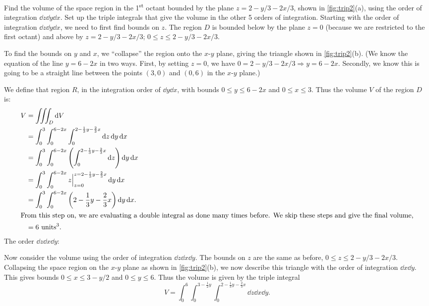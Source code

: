 \begin{example}\label{ex_trip2}%
Find the volume of the space region in the 1\textsuperscript{st} octant bounded by the plane $z=2-y/3-2x/3$, shown in \autoref{fig:trip2}(a), using the order of integration $\dd z\dd y\dd x$. Set up the triple integrals that give the volume in the other 5 orders of integration.
\solution
Starting with the order of integration $\dd z\dd y\dd x$, we need to first find bounds on $z$. The region $D$ is bounded below by the plane $z=0$ (because we are restricted to the first octant) and above by $z=2-y/3-2x/3$; $0\leq z\leq 2-y/3-2x/3$.

To find the bounds on $y$ and $x$, we ``collapse'' the region onto the $x$-$y$ plane, giving the triangle shown in \autoref{fig:trip2}(b). (We know the equation of the line $y=6-2x$ in two ways. First, by setting $z=0$, we have $0 = 2-y/3-2x/3 \Rightarrow y=6-2x$. Secondly, we know this is going to be a straight line between the points $(3,0)$ and $(0,6)$ in the $x$-$y$ plane.)

We define that region $R$, in the integration order of $\dd y\dd x$, with bounds $0\leq y\leq 6-2x$ and $0\leq x\leq 3$. Thus the volume $V$ of the region $D$ is:
\begin{align*}
	V &= \iiint_D \dd V\\
	&= \int_0^3\int_0^{6-2x}\int_0^{2-\frac 13y-\frac 23x}\dd z\dd y\dd x \\
	&= \int_0^3\int_0^{6-2x}\left(\int_0^{2-\frac 13y-\frac 23x}\dd z\right)\dd y\dd x \\
	&=\int_0^3\int_0^{6-2x}z\Big|_{z=0}^{z=2-\frac 13y-\frac 23x}\dd y\dd x \\
	&= \int_0^3\int_0^{6-2x}\left(2-\frac 13y-\frac 23x\right)\dd y\dd x.\\
	\intertext{From this step on, we are evaluating a double integral as done many times before. We skip these steps and give the final volume,}
	&= 6\ \text{units}^3.		
\end{align*}
\noindent The order $\dd z\dd x\dd y$:\bigskip

Now consider the volume using the order of integration $\dd z\dd x\dd y$. The bounds on $z$ are the same as before, $0\leq z\leq 2-y/3-2x/3$. Collapsing the space region on the $x$-$y$ plane as shown in \autoref{fig:trip2}(b), we now describe this triangle with the order of integration $\dd x\dd y$. This gives bounds $0\leq x\leq 3-y/2$ and $0\leq y\leq 6$. Thus the volume is given by the triple integral
\[V = \int_0^6\int_0^{3-\frac12y}\int_0^{2-\frac13y-\frac23x}\dd z\dd x\dd y.\]


\end{example}

